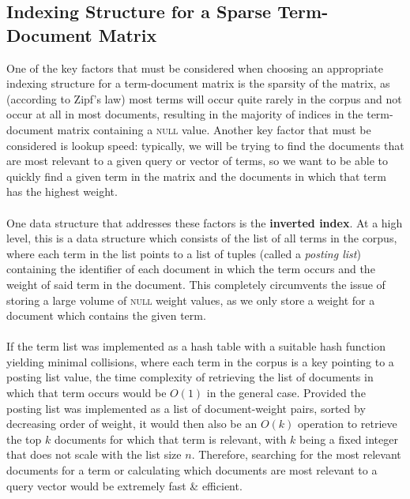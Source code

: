 \documentclass[a4paper]{article}
\begin{document}
\subsection{Indexing Structure for a Sparse Term-Document Matrix}
One of the key factors that must be considered when choosing an appropriate indexing structure for a term-document matrix is the sparsity of the matrix, as (according to Zipf's law) most terms will occur quite rarely in the corpus and not occur at all in most documents, resulting in the majority of indices in the term-document matrix containing a \textsc{null} value.
Another key factor that must be considered is lookup speed: typically, we will be trying to find the documents that are most relevant to a given query or vector of terms, so we want to be able to quickly find a given term in the matrix and the documents in which that term has the highest weight.
\\\\
One data structure that addresses these factors is the \textbf{inverted index}.
At a high level, this is a data structure which consists of the list of all terms in the corpus, where each term in the list points to a list of tuples (called a \textit{posting list}) containing the identifier of each document in which the term occurs and the weight of said term in the document.
This completely circumvents the issue of storing a large volume of \textsc{null} weight values, as we only store a weight for a document which contains the given term.
\\\\
If the term list was implemented as a hash table with a suitable hash function yielding minimal collisions, where each term in the corpus is a key pointing to a posting list value, the time complexity of retrieving the list of documents in which that term occurs would be $O(1)$ in the general case.
Provided the posting list was implemented as a list of document-weight pairs, sorted by decreasing order of weight, it would then also be an $O(k)$ operation to retrieve the top $k$ documents for which that term is relevant, with $k$ being a fixed integer that does not scale with the list size $n$.
Therefore, searching for the most relevant documents for a term or calculating which documents are most relevant to a query vector would be extremely fast \& efficient. 
\end{document}
